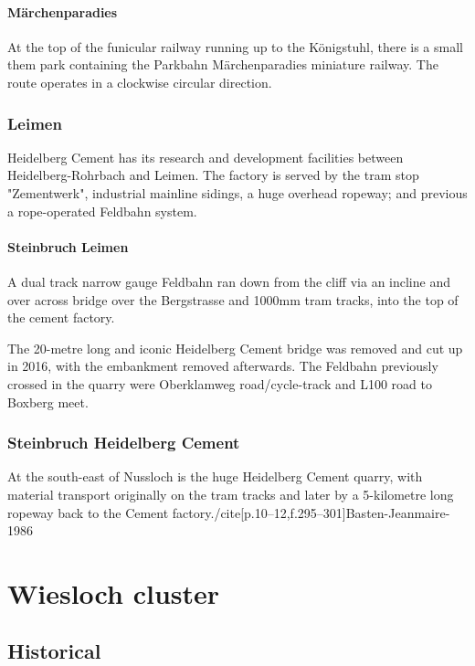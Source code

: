 \documentclass[a4paper]{report}
\begin{document}
\subsection{Märchenparadies}

At the top of the funicular railway running up to the Königstuhl,
there is a small them park containing the Parkbahn Märchenparadies
miniature railway.  The route operates in a clockwise circular
direction.

\section{Leimen}

Heidelberg Cement has its research and development facilities between
Heidelberg-Rohrbach and Leimen.  The factory is served by the tram
stop "Zementwerk", industrial mainline sidings, a huge overhead
ropeway; and previous a rope-operated Feldbahn system.

\subsection{Steinbruch Leimen}

A dual track narrow gauge Feldbahn ran down from the cliff via an
incline and over across bridge over the Bergstrasse and 1000mm tram
tracks, into the top of the cement factory.

The 20-metre long and iconic Heidelberg Cement bridge was removed and
cut up in 2016, with the embankment removed afterwards.  The Feldbahn
previously crossed in the quarry were Oberklamweg road/cycle-track and
L100 road to Boxberg meet.

\section{Steinbruch Heidelberg Cement}

At the south-east of Nussloch is the huge Heidelberg Cement quarry,
with material transport originally on the tram tracks and later by a
5-kilometre long ropeway back to the Cement factory./cite[p.10--12,f.295--301]{Basten-Jeanmaire-1986}

\part{Wiesloch cluster}

\chapter{Historical}
\end{document}
